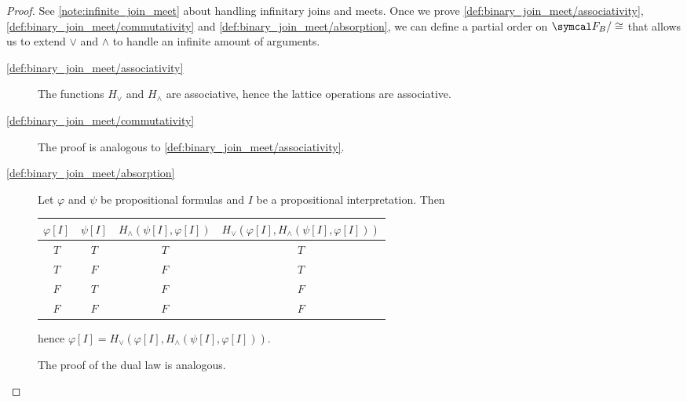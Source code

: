 \begin{proof}
  See \cref{note:infinite_join_meet} about handling infinitary joins and meets. Once we prove \ref{def:binary_join_meet/associativity}, \ref{def:binary_join_meet/commutativity} and \ref{def:binary_join_meet/absorption}, we can define a partial order on $\Cal{F}_B / \cong$ that allows us to extend $\lor$ and $\land$ to handle an infinite amount of arguments.

  \begin{description}
    \item[\ref{def:binary_join_meet/associativity}] The functions $H_\lor$ and $H_\land$ are associative, hence the lattice operations are associative.
    \item[\ref{def:binary_join_meet/commutativity}] The proof is analogous to \ref{def:binary_join_meet/associativity}.
    \item[\ref{def:binary_join_meet/absorption}] Let $\varphi$ and $\psi$ be propositional formulas and $I$ be a propositional interpretation. Then
    \begin{Center}
      \begin{tabular}{c c | c | c}
        $\varphi[I]$ & $\psi[I]$ & $H_\land(\psi[I], \varphi[I])$ & $H_\lor(\varphi[I], H_\land(\psi[I], \varphi[I]))$ \\
        \hline
        $T$          & $T$       & $T$                            & $T$    \\
        $T$          & $F$       & $F$                            & $T$    \\
        $F$          & $T$       & $F$                            & $F$    \\
        $F$          & $F$       & $F$                            & $F$
      \end{tabular}
    \end{Center}
    hence $\varphi[I] = H_\lor(\varphi[I], H_\land(\psi[I], \varphi[I]))$.

    The proof of the dual law is analogous.


\end{description}
\end{proof}
